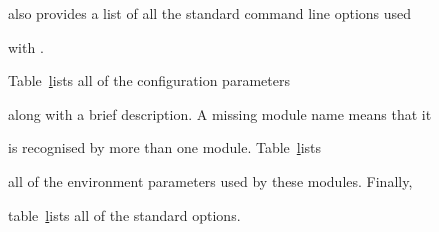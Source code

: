 also provides a list of all the standard command line options used


with \HTK.





Table~\href{t:openvcparms} lists all of the configuration parameters


along with a brief description.  A missing module name means that it


is recognised by more than one module. Table~\href{t:openvars} lists


all of the environment parameters used by these modules.  Finally,


table~\href{t:stdopts} lists all of the standard options.





